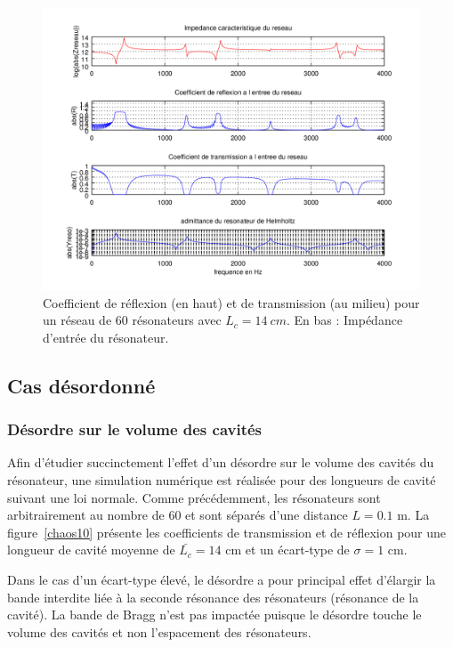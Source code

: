 \begin{figure}
\centering
\includegraphics[scale=0.7]{./images_chp1/ex_coef_rapport.png}
\caption{\label{ex_coef_RT} Coefficient de réflexion (en haut) et de transmission (au milieu) pour un réseau de 60 résonateurs avec $L_c=14~cm$. En bas : Impédance d'entrée du résonateur.}
\end{figure}

\subsection{Cas désordonné}

\subsubsection{Désordre sur le volume des cavités}

Afin d'étudier succinctement l'effet d'un désordre sur le volume des cavités du résonateur, une simulation numérique est réalisée pour des longueurs de cavité suivant une loi normale. Comme précédemment, les résonateurs sont arbitrairement au nombre de 60 et sont séparés d'une distance $L=0.1$ m. La figure~\ref{chaos10} présente les coefficients de transmission et de réflexion pour une longueur de cavité moyenne de $\bar{L_c}=14$ cm et un écart-type  de $\sigma = 1$ cm.


Dans le cas d'un écart-type élevé, le désordre a pour principal effet d'élargir la bande interdite liée à la seconde résonance des résonateurs (résonance de la cavité). La bande de Bragg n'est pas impactée puisque le désordre touche le volume des cavités et non l'espacement des résonateurs.


